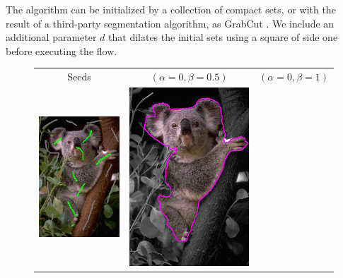 \documentclass[runningheads]{llncs}
\begin{document}
The algorithm can be initialized by a collection of compact sets, or with the result of a third-party segmentation algorithm, as GrabCut \cite{rother04grabcut}. We include an additional parameter $d$ that dilates the initial sets using a square of side one before executing the flow.
	
\begin{figure}
\center
\begin{tabular}{ccc}
Seeds & $(\alpha=0, \beta=0.5)$ & $(\alpha=0,\beta=1)$ \\
 	\includegraphics[scale=0.25]{images/segmentation/coala/seeds.png} & 
	\includegraphics[scale=0.25]{images/segmentation/coala/r3/lg0_sq05_dt1_it50.png} & 

\end{tabular}
\end{figure}
\end{document}
